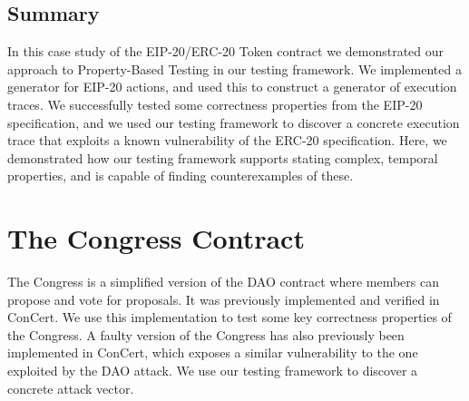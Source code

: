 \documentclass[twoside,11pt,openright]{report}
\newcommand{\pbt}{Property-Based Testing}
\begin{document}
\subsection{Summary}
In this case study of the EIP-20/ERC-20 Token contract we demonstrated our approach to \pbt{} in our testing framework. We implemented a generator for EIP-20 actions, and used this to construct a generator of execution traces. We successfully tested some correctness properties from the EIP-20 specification, and we used our testing framework to discover a concrete execution trace that exploits a known vulnerability of the ERC-20 specification. Here, we demonstrated how our testing framework supports stating complex, temporal properties, and is capable of finding counterexamples of these. 




\section{The Congress Contract}
\label{sec:congress-example}
The Congress is a simplified version of the DAO contract where members can propose and vote for proposals. It was previously implemented and verified in ConCert\cite{nielsen2019smart}. We use this implementation to test some key correctness properties of the Congress. A faulty version of the Congress has also previously been implemented in ConCert, which exposes a similar vulnerability to the one exploited by the DAO attack. We use our testing framework to discover a concrete attack vector.
\end{document}
